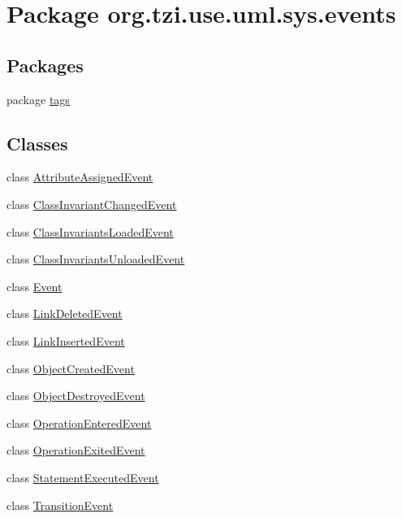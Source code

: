 \hypertarget{namespaceorg_1_1tzi_1_1use_1_1uml_1_1sys_1_1events}{\section{Package org.\-tzi.\-use.\-uml.\-sys.\-events}
\label{namespaceorg_1_1tzi_1_1use_1_1uml_1_1sys_1_1events}
}
\subsection*{Packages}
\begin{DoxyCompactItemize}
\item 
package \hyperlink{namespaceorg_1_1tzi_1_1use_1_1uml_1_1sys_1_1events_1_1tags}{tags}
\end{DoxyCompactItemize}
\subsection*{Classes}
\begin{DoxyCompactItemize}
\item 
class \hyperlink{classorg_1_1tzi_1_1use_1_1uml_1_1sys_1_1events_1_1_attribute_assigned_event}{Attribute\-Assigned\-Event}
\item 
class \hyperlink{classorg_1_1tzi_1_1use_1_1uml_1_1sys_1_1events_1_1_class_invariant_changed_event}{Class\-Invariant\-Changed\-Event}
\item 
class \hyperlink{classorg_1_1tzi_1_1use_1_1uml_1_1sys_1_1events_1_1_class_invariants_loaded_event}{Class\-Invariants\-Loaded\-Event}
\item 
class \hyperlink{classorg_1_1tzi_1_1use_1_1uml_1_1sys_1_1events_1_1_class_invariants_unloaded_event}{Class\-Invariants\-Unloaded\-Event}
\item 
class \hyperlink{classorg_1_1tzi_1_1use_1_1uml_1_1sys_1_1events_1_1_event}{Event}
\item 
class \hyperlink{classorg_1_1tzi_1_1use_1_1uml_1_1sys_1_1events_1_1_link_deleted_event}{Link\-Deleted\-Event}
\item 
class \hyperlink{classorg_1_1tzi_1_1use_1_1uml_1_1sys_1_1events_1_1_link_inserted_event}{Link\-Inserted\-Event}
\item 
class \hyperlink{classorg_1_1tzi_1_1use_1_1uml_1_1sys_1_1events_1_1_object_created_event}{Object\-Created\-Event}
\item 
class \hyperlink{classorg_1_1tzi_1_1use_1_1uml_1_1sys_1_1events_1_1_object_destroyed_event}{Object\-Destroyed\-Event}
\item 
class \hyperlink{classorg_1_1tzi_1_1use_1_1uml_1_1sys_1_1events_1_1_operation_entered_event}{Operation\-Entered\-Event}
\item 
class \hyperlink{classorg_1_1tzi_1_1use_1_1uml_1_1sys_1_1events_1_1_operation_exited_event}{Operation\-Exited\-Event}
\item 
class \hyperlink{classorg_1_1tzi_1_1use_1_1uml_1_1sys_1_1events_1_1_statement_executed_event}{Statement\-Executed\-Event}
\item 
class \hyperlink{classorg_1_1tzi_1_1use_1_1uml_1_1sys_1_1events_1_1_transition_event}{Transition\-Event}
\end{DoxyCompactItemize}
